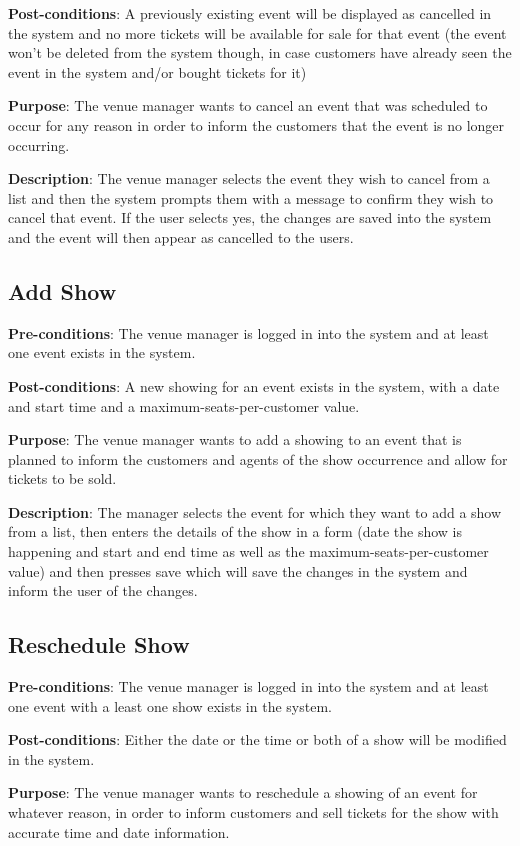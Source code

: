 \textbf{Post-conditions}: A previously existing event will be displayed as cancelled in the system and no more tickets will be available for sale for that event (the event won't be deleted from the system though, in case customers have already seen the event in the system and/or bought tickets for it)

\textbf{Purpose}: The venue manager wants to cancel an event that was scheduled to occur for any reason in order to inform the customers that the event is no longer occurring.

\textbf{Description}: The venue manager selects the event they wish to cancel from a list and then the system prompts them with a message to confirm they wish to cancel that event. If the user selects yes, the changes are saved into the system and the event will then appear as cancelled to the users.

\subsection{Add Show}
\textbf{Pre-conditions}: The venue manager is logged in into the system and at least one event exists in the system.

\textbf{Post-conditions}: A new showing for an event exists in the system, with a date and start time and a maximum-seats-per-customer value.

\textbf{Purpose}: The venue manager wants to add a showing to an event that is planned to inform the customers and agents of the show occurrence and allow for tickets to be sold.

\textbf{Description}: The manager selects the event for which they want to add a show from a list, then enters the details of the show in a form (date the show is happening and start and end time as well as the maximum-seats-per-customer value) and then presses save which will save the changes in the system and inform the user of the changes.

\subsection{Reschedule Show}
\textbf{Pre-conditions}: The venue manager is logged in into the system and at least one event with a least one show exists in the system.

\textbf{Post-conditions}: Either the date or the time or both of a show will be modified in the system.

\textbf{Purpose}: The venue manager wants to reschedule a showing of an event for whatever reason, in order to inform customers and sell tickets for the show with accurate time and date information.

